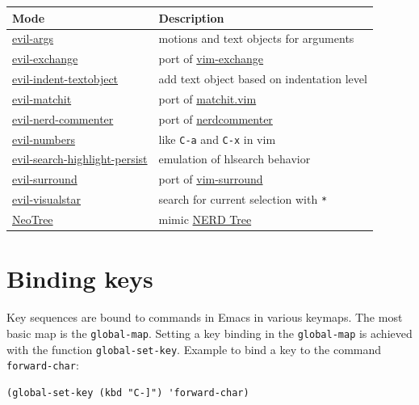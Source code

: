 \documentclass[11pt]{article}
\begin{document}
\begin{center}
\begin{tabular}{ll}
Mode & Description\\
\hline
\href{https://github.com/wcsmith/evil-args}{evil-args} & motions and text objects for arguments\\
\href{https://github.com/Dewdrops/evil-exchange}{evil-exchange} & port of \href{https://github.com/tommcdo/vim-exchange}{vim-exchange}\\
\href{https://github.com/cofi/evil-indent-textobject}{evil-indent-textobject} & add text object based on indentation level\\
\href{https://github.com/redguardtoo/evil-matchit}{evil-matchit} & port of \href{http://www.vim.org/scripts/script.php?script\_id=39}{matchit.vim}\\
\href{https://github.com/redguardtoo/evil-nerd-commenter}{evil-nerd-commenter} & port of \href{https://github.com/scrooloose/nerdcommenter}{nerdcommenter}\\
\href{https://github.com/cofi/evil-numbers}{evil-numbers} & like \texttt{C-a} and \texttt{C-x} in vim\\
\href{https://github.com/juanjux/evil-search-highlight-persist}{evil-search-highlight-persist} & emulation of hlsearch behavior\\
\href{https://github.com/timcharper/evil-surround}{evil-surround} & port of \href{https://github.com/tpope/vim-surround}{vim-surround}\\
\href{https://github.com/bling/evil-visualstar}{evil-visualstar} & search for current selection with \texttt{*}\\
\href{https://github.com/jaypei/emacs-neotree}{NeoTree} & mimic \href{https://github.com/scrooloose/nerdtree}{NERD Tree}\\
\end{tabular}
\end{center}

\section{Binding keys}
\label{sec:org61d8d49}
Key sequences are bound to commands in Emacs in various keymaps. The most basic
map is the \texttt{global-map}. Setting a key binding in the \texttt{global-map} is achieved
with the function \texttt{global-set-key}. Example to bind a key to the command
\texttt{forward-char}:

\begin{verbatim}
(global-set-key (kbd "C-]") 'forward-char)
\end{verbatim}
\end{document}
